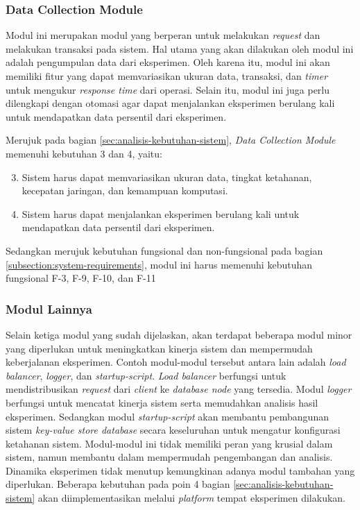 \subsubsection{Data Collection Module}
\label{subsubsection:data-collection-module}

Modul ini merupakan modul yang berperan untuk melakukan \textit{request} dan melakukan transaksi pada sistem. Hal utama yang akan dilakukan oleh modul ini adalah pengumpulan data dari eksperimen. Oleh karena itu, modul ini akan memiliki fitur yang dapat memvariasikan ukuran data, transaksi, dan \textit{timer} untuk mengukur \textit{response time} dari operasi. Selain itu, modul ini juga perlu dilengkapi dengan otomasi agar dapat menjalankan eksperimen berulang kali untuk mendapatkan data persentil dari eksperimen.

Merujuk pada bagian \ref{sec:analisis-kebutuhan-sistem}, \textit{Data Collection Module} memenuhi kebutuhan 3 dan 4, yaitu:

\begin{enumerate}
    \setcounter{enumi}{2}
    \item Sistem harus dapat memvariasikan ukuran data, tingkat ketahanan, kecepatan jaringan, dan kemampuan komputasi.
    \item Sistem harus dapat menjalankan eksperimen berulang kali untuk mendapatkan data persentil dari eksperimen.
\end{enumerate}

Sedangkan merujuk kebutuhan fungsional dan non-fungsional pada bagian \ref{subsection:system-requirements}, modul ini harus memenuhi kebutuhan fungsional F-3, F-9, F-10, dan F-11

\subsubsection{Modul Lainnya}
\label{subsubsection:other-modules}

Selain ketiga modul yang sudah dijelaskan, akan terdapat beberapa modul minor yang diperlukan untuk meningkatkan kinerja sistem dan mempermudah keberjalanan eksperimen. Contoh modul-modul tersebut antara lain adalah \textit{load balancer}, \textit{logger}, dan \textit{startup-script}. \textit{Load balancer} berfungsi untuk mendistribusikan \textit{request} dari \textit{client} ke \textit{database node} yang tersedia. Modul \textit{logger} berfungsi untuk mencatat kinerja sistem serta memudahkan analisis hasil eksperimen. Sedangkan modul \textit{startup-script} akan membantu pembangunan sistem \textit{key-value store database} secara keseluruhan untuk mengatur konfigurasi ketahanan sistem. Modul-modul ini tidak memiliki peran yang krusial dalam sistem, namun membantu dalam mempermudah pengembangan dan analisis. Dinamika eksperimen tidak menutup kemungkinan adanya modul tambahan yang diperlukan. Beberapa kebutuhan pada poin 4 bagian \ref{sec:analisis-kebutuhan-sistem} akan diimplementasikan melalui \textit{platform} tempat eksperimen dilakukan.

